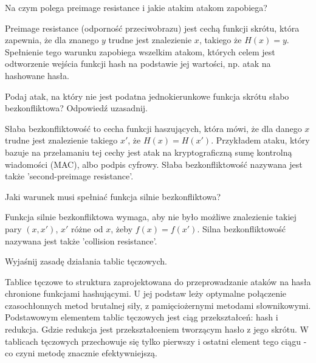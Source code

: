 \documentclass[answers,11pt]{exam}
\begin{document}
\begin{questions}


\question Na czym polega preimage resistance i jakie atakim atakom zapobiega?
\begin{solution}
Preimage resistance (odporność przeciwobrazu) jest cechą funkcji skrótu, która zapewnia, że dla znanego $y$ trudne jest znalezienie $x$, takiego że $H(x) = y$. Spełnienie tego warunku zapobiega wszelkim atakom, których celem jest odtworzenie wejścia funkcji hash na podstawie jej wartości, np. atak na hashowane hasła.
\end{solution}


\question Podaj atak, na który nie jest podatna jednokierunkowe funkcja skrótu słabo bezkonfliktowa? Odpowiedź uzasadnij.
\begin{solution}
Słaba bezkonfliktowość to cecha funkcji haszujących, która mówi, że dla danego $x$ trudne jest znalezienie takiego $x'$, że $H(x) = H(x')$.
Przykładem ataku, który bazuje na przełamaniu tej cechy jest atak na kryptograficzną sumę kontrolną wiadomości (MAC), albo podpis cyfrowy.
Słaba bezkonfliktowość nazywana jest także 'second-preimage resistance'.
\end{solution}

\question Jaki warunek musi spełniać funkcja silnie bezkonfliktowa?
\begin{solution}
Funkcja silnie bezkonfliktowa wymaga, aby nie było możliwe znalezienie takiej pary $(x,x')$, $x'$ różne od $x$, żeby $f(x) = f(x')$.
Silna bezkonfliktowość nazywana jest także 'collision resistance'.
\end{solution}

\question Wyjaśnij zasadę działania tablic tęczowych.
\begin{solution}
Tablice tęczowe to struktura zaprojektowana do przeprowadzanie ataków na hasła chronione funkcjami hashującymi. U jej podstaw leży optymalne połączenie czasochłonnych metod brutalnej siły, z pamięciożernymi metodami słownikowymi. Podstawowym elementem tablic tęczowych jest ciąg przekształceń: hash i redukcja. Gdzie redukcja jest przekształceniem tworzącym hasło z jego skrótu. W tablicach tęczowych przechowuje się tylko pierwszy i ostatni element tego ciągu - co czyni metodę znacznie efektywniejszą.
\end{solution}


\end{questions}
\end{document}
